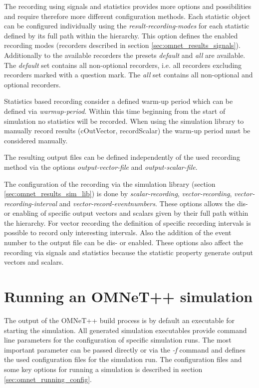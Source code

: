 The recording using signals and statistics provides more options and possibilities and require therefore more different configuration methods.
Each statistic object can be configured individually using the \emph{result-recording-modes} for each statistic defined by its full path within the hierarchy.
This option defines the enabled recording modes (recorders described in section \ref{sec:omnet_results_signals}).
Additionally to the available recorders the presets \emph{default} and \emph{all} are available.
The \emph{default} set contains all non-optional recorders, i.e. all recorders excluding recorders marked with a question mark.
The \emph{all} set contains all non-optional and optional recorders. \cite[section 12.2.1]{omnet_manual}

Statistics based recording consider a defined warm-up period which can be defined via \emph{warmup-period}.
Within this time beginning from the start of simulation no statistics will be recorded.
When using the simulation library to manually record results (cOutVector, recordScalar) the warm-up period must be considered manually. \cite[section 12.2.2]{omnet_manual}

The resulting output files can be defined independently of the used recording method via the options \emph{output-vector-file} and \emph{output-scalar-file}. \cite[section 12.2.3]{omnet_manual}

The configuration of the recording via the simulation library (section \ref{sec:omnet_results_sim_lib}) is done by \emph{scalar-recording}, \emph{vector-recording}, \emph{vector-recording-interval} and \emph{vector-record-eventnumbers}.
These options allows the dis- or enabling of specific output vectors and scalars given by their full path within the hierarchy.
For vector recording the definition of specific recording intervals is possible to record only interesting intervals.
Also the addition of the event number to the output file can be dis- or enabled.
These options also affect the recording via signals and statistics because the statistic property generate output vectors and scalars. \cite[section 12.2.4, section 12.2.5]{omnet_manual}

\section{Running an OMNeT++ simulation}
\label{sec:omnet_running}

The output of the OMNeT++ build process is by default an executable for starting the simulation.
All generated simulation executables provide command line parameters for the configuration of specific simulation runs.
The most important parameter can be passed directly or via the \emph{-f} command and defines the used configuration files for the simulation run.
The configuration files and some key options for running a simulation is described in section \ref{sec:omnet_running_config}.

